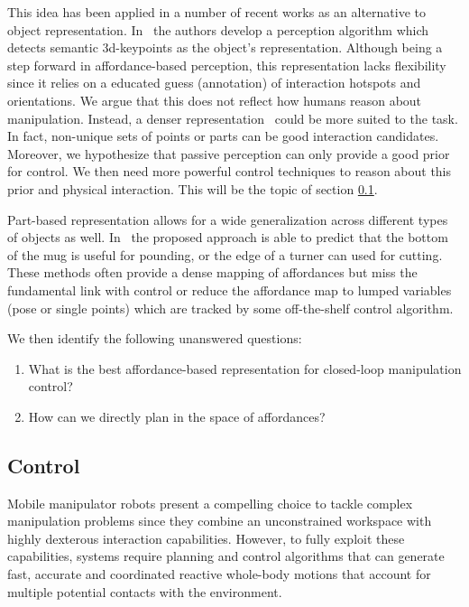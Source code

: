 This idea has been applied in a number of recent works as an alternative to object representation. In~\cite{gao2021kpam} the authors develop a perception algorithm which detects semantic 3d-keypoints as the object's representation. Although being a step forward in affordance-based perception, this representation lacks flexibility since it relies on a educated guess (annotation) of interaction hotspots and orientations. We argue that this does not reflect how humans reason about manipulation. Instead, a denser representation~\cite{nagarajan2019grounded, mo2021where2act} could be more suited to the task. In fact, non-unique sets of points or parts can be good interaction candidates. Moreover, we hypothesize that passive perception can only provide a good prior for control. We then need more powerful control techniques to reason about this prior and physical interaction. This will be the topic of section \ref{sec:related_work_control}.

Part-based representation allows for a wide generalization across different types of objects as well. In~\cite{myers2015affordance} the proposed approach is able to predict that the bottom of the mug is useful for pounding, or the edge of a turner can used for cutting. These methods often provide a dense mapping of affordances but miss the fundamental link with control or reduce the affordance map to lumped variables (pose or single points) which are tracked by some off-the-shelf control algorithm. 

We then identify the following unanswered questions:
\begin{enumerate}
\item What is the best affordance-based representation for closed-loop manipulation control? 
\item How can we directly plan in the space of affordances?
\end{enumerate} 
 
\subsection{Control} \label{sec:related_work_control}
Mobile manipulator robots present a compelling choice to tackle complex manipulation problems since they combine an unconstrained workspace with highly dexterous interaction capabilities. However, to fully exploit these capabilities, systems require planning and control algorithms that can generate fast, accurate and coordinated reactive whole-body motions that account for multiple potential contacts with the environment. 

